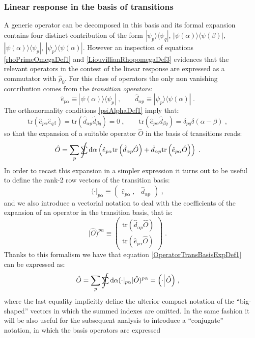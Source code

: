 \documentclass[a4paper]{article}
\newcommand{\dd}{{\rm d}}
\newcommand{\sint}{\mathrlap{\displaystyle\int}
\mathrlap{\textstyle\sum}
\phantom{\mathrlap{\displaystyle
\int}\textstyle\sum}}
\newcommand{\be}{\begin{equation}}
\newcommand{\ee}{\end{equation}}
\newcommand{\qq}{\qquad}
\newcommand{\lb}{\label}
\newcommand{\mat}[1]{\begin{pmatrix} #1\end{pmatrix}}
\newcommand{\op}[1]{\hat {#1}}
\newcommand{\trace}[1]{\mathrm{tr}\left(#1\right)}
\newcommand{\ketbra}[2]{| #1 \rangle \langle #2 |}
\newcommand{\sket}[2]{| #2)^{#1}}
\newcommand{\sbra}[2]{( #2|_{#1}}
\newcommand{\dbraket}[2]{\Bigl(#1 \Bigl| #2 \Bigr)}
\newcommand{\dmnot}{\op{\rho}_0}
\newcommand{\excite}[2]{\op e_{{#1}{#2}}}
\newcommand{\decay}[2]{\op d_{{#1}{#2}}}
\begin{document}
\subsubsection{Linear response in the basis of transitions}

A generic operator can be decomposed in this basis and its formal expansion contains four distinct contribution of the form $\ketbra{\psi_p}{\psi_q}$, 
$\ketbra{\psi(\alpha)}{\psi(\beta)}$, $\ketbra{\psi(\alpha)}{\psi_p}$, $\ketbra{\psi_p}{\psi(\alpha)}$. However an inspection of equations \eqref{rhoPrimeOmegaDef1}
and \eqref{LiouvillianRhopomegaDef3} evidences that the relevant operators in the contest of the linear response are expressed as a commutator with $\dmnot$. 
For this class of operators the only non vanishing contribution comes from the \emph{transition operators}:
\be
\excite{p}{\alpha} \equiv \ketbra{\psi(\alpha)}{\psi_p}\;, \qq
\decay{\alpha}{p} \equiv \ketbra{\psi_p}{\psi(\alpha)} \;.
\ee
The orthonormality conditions \eqref{psiAlphaDef1} imply that:
\be\lb{transitionOpOrthonormalityDef1}
\trace{\excite{p}{\alpha}\excite{q}{\beta}} = \trace{\decay{\alpha}{p}\decay{\beta}{q}} = 0 \;, \qq
\trace{\excite{p}{\alpha}\decay{\beta}{q}} = \delta_{pq}\delta(\alpha-\beta) \;,
\ee
so that the expansion of a suitable operator $\op O$ in the basis of transitions reads:
\be\lb{OperatorTransBasisExpDef1}
\op O = \sum_p\sint \dd \alpha\left(
\excite{p}{\alpha}\trace{\decay{\alpha}{p}\op O} + \decay{\alpha}{p}\trace{\excite{p}{\alpha}\op O}
\right) \;.
\ee
In order to recast this expansion in a simpler expression it turns out to be useful to define the rank-2 row vectors of the transition basis: 
\be
\sbra{p\alpha}{\cdot} \equiv 
\mat{ \excite{p}{\alpha} \;, & \decay{\alpha}{p} }\;,
\ee
and we also introduce a vectorial notation to deal with the coefficients of the expansion of an operator in the transition basis, that is: 
\be\lb{OperatorTransitionCoeffDef1}
\sket{p\alpha}{\op O}  \equiv \mat{ \trace{\decay{\alpha}{p}\op O } \\ 
\trace{\excite{p}{\alpha}\op O}} \; .
\ee
Thanks to this formalism we have that equation \eqref{OperatorTransBasisExpDef1} can be expressed as:
\be\lb{OperatorTransBasisExpDef2}
\op O = \sum_p\sint \dd \alpha \sbra{p\alpha}{\cdot}\sket{p\alpha}{\op O} = 
\dbraket{\cdot}{\op O} \;,
\ee
where the last equality implicitly define the ulterior compact notation of the ``big-shaped'' vectors in which the summed indexes are omitted.  
In the same fashion it will be also useful for the subsequent analysis to introduce a ``conjugate'' notation, in which the basis operators are expressed
\end{document}
